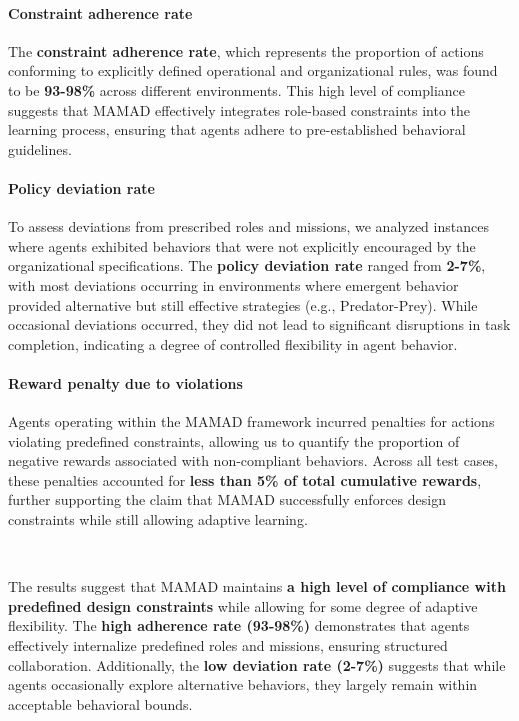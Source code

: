 \documentclass[pdflatex,sn-mathphys-num]{sn-jnl}%
\theoremstyle{thmstyleone}%
\theoremstyle{thmstyletwo}%
\theoremstyle{thmstylethree}%
\begin{document}
\paragraph{Constraint adherence rate}
The \textbf{constraint adherence rate}, which represents the proportion of actions conforming to explicitly defined operational and organizational rules, was found to be \textbf{93-98\%} across different environments. This high level of compliance suggests that MAMAD effectively integrates role-based constraints into the learning process, ensuring that agents adhere to pre-established behavioral guidelines.

\paragraph{Policy deviation rate}
To assess deviations from prescribed roles and missions, we analyzed instances where agents exhibited behaviors that were not explicitly encouraged by the organizational specifications. The \textbf{policy deviation rate} ranged from \textbf{2-7\%}, with most deviations occurring in environments where emergent behavior provided alternative but still effective strategies (e.g., Predator-Prey). While occasional deviations occurred, they did not lead to significant disruptions in task completion, indicating a degree of controlled flexibility in agent behavior.

\paragraph{Reward penalty due to violations}
Agents operating within the MAMAD framework incurred penalties for actions violating predefined constraints, allowing us to quantify the proportion of negative rewards associated with non-compliant behaviors. Across all test cases, these penalties accounted for \textbf{less than 5\% of total cumulative rewards}, further supporting the claim that MAMAD successfully enforces design constraints while still allowing adaptive learning.

\

The results suggest that MAMAD maintains \textbf{a high level of compliance with predefined design constraints} while allowing for some degree of adaptive flexibility. The \textbf{high adherence rate (93-98\%)} demonstrates that agents effectively internalize predefined roles and missions, ensuring structured collaboration. Additionally, the \textbf{low deviation rate (2-7\%)} suggests that while agents occasionally explore alternative behaviors, they largely remain within acceptable behavioral bounds.
\end{document}

